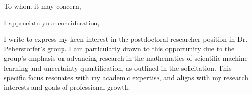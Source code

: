 \documentclass[11pt,a4paper,sans]{moderncv}        %
\begin{document}
\date{\today}
\opening{To whom it may concern,}
\closing{I appreciate your consideration,}
\makelettertitle


I write to express my keen interest in the postdoctoral researcher position in Dr. Peherstorfer's group. I am particularly drawn to this opportunity due to the group's emphasis on advancing research in the mathematics of scientific machine learning and uncertainty quantification, as outlined in the solicitation. This specific focus resonates with my academic expertise, and aligns with my research interests and goals of professional growth.
\end{document}
